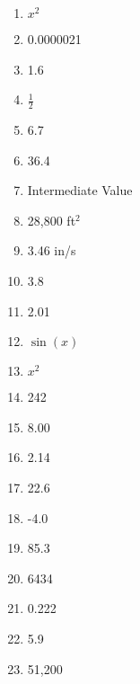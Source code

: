\documentclass[../uilmath.tex]{subfiles}
\begin{document}
\begin{enumerate}[label=\bfseries\arabic*.]
    \item %
    $x^2$

    \item %
    0.0000021

    \item %
    1.6

    \item %
    $\frac{1}{2}$

    \item %
    6.7

    \item %
    36.4

    \item %
    Intermediate Value 

    \item %
    28,800 ft$^2$

    \item %
    3.46 in/s 

    \item %
    3.8

    \item %
    2.01

    \item %
    $\sin(x)$

    \item %
    $x^2$

    \item %
    242 

    \item %
    8.00

    \item %
    2.14

    \item %
    22.6

    \item %
    -4.0

    \item %
    85.3

    \item %
    6434

    \item %
    0.222

    \item %
    5.9

    \item %
    51,200


\end{enumerate}
\end{document}
